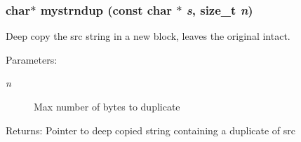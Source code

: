 \subsubsection{\setlength{\rightskip}{0pt plus 5cm}char$\ast$ mystrndup (const char $\ast$ {\em s}, size\_\-t {\em n})}\label{mystring_8h_9dc11eca5ee6b0e312610650bbe36e6d}


Deep copy the src string in a new block, leaves the original intact. 

\begin{Desc}
\item[Parameters:]
\begin{description}
\item[{\em n}]Max number of bytes to duplicate \end{description}
\end{Desc}
\begin{Desc}
\item[Returns:]Pointer to deep copied string containing a duplicate of src \end{Desc}

